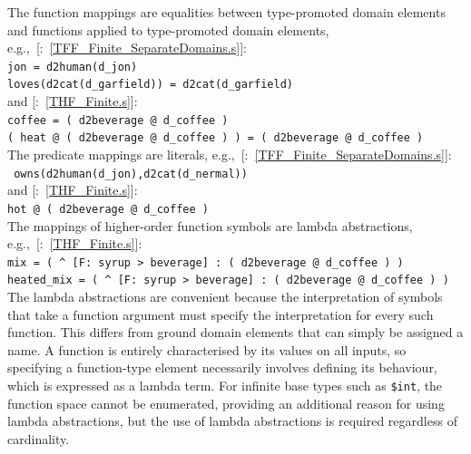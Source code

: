 \documentclass{ceurart}
\newcommand{\smalltt}[1]{\small \texttt{#1}}
\newcommand{\example}{{\scriptsize \faFile[regular]}}
\newcommand{\tildenot}{\raisebox{0.4ex}{\texttildelow}}
\begin{document}
The function mappings are equalities between type-promoted domain elements and functions applied 
to type-promoted domain elements, e.g.,~[\example{}:~\ref{TFF_Finite_SeparateDomains.s}]:\\
\hspace*{0.5cm}\smalltt{jon = d2human(d\_jon)}\\
\hspace*{0.5cm}\smalltt{loves(d2cat(d\_garfield)) = d2cat(d\_garfield)}\\
and [\example{}:~\ref{THF_Finite.s}]:\\
\hspace*{0.5cm}\smalltt{coffee = ( d2beverage @ d\_coffee )}\\
\hspace*{0.5cm}\smalltt{( heat @ ( d2beverage @ d\_coffee ) ) = ( d2beverage @ d\_coffee )}\\
The predicate mappings are literals, 
e.g.,~[\example{}:~\ref{TFF_Finite_SeparateDomains.s}]:\\
\hspace*{0.5cm}\smalltt{\tildenot{}\,owns(d2human(d\_jon),d2cat(d\_nermal))}\\
and [\example{}:~\ref{THF_Finite.s}]:\\
\hspace*{0.5cm}\smalltt{hot @ ( d2beverage @ d\_coffee )}\\
The mappings of higher-order function symbols are lambda abstractions, 
e.g.,~[\example{}:~\ref{THF_Finite.s}]:\\
\hspace*{0.5cm}\smalltt{mix = ( \textasciicircum~[F: syrup > beverage] : ( d2beverage @ d\_coffee ) )}\\
\hspace*{0.5cm}\smalltt{heated\_mix = ( \textasciicircum~[F: syrup > beverage] : ( d2beverage @ d\_coffee ) )}\\
The lambda abstractions are convenient because the interpretation of symbols that take a function 
argument must specify the interpretation for every such function. 
This differs from ground domain elements that can simply be assigned a name. 
A function is entirely characterised by its values on all inputs, so specifying a function-type 
element necessarily involves defining its behaviour, which is expressed as a lambda term. 
For infinite base types such as \smalltt{\$int}, the function space cannot be enumerated, 
providing an additional reason for using lambda abstractions, but the use of lambda abstractions 
is required regardless of cardinality.
\end{document}

